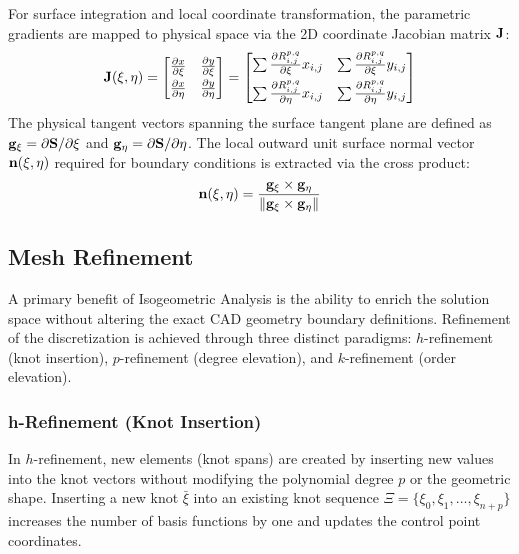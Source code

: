 For surface integration and local coordinate transformation, the parametric gradients are mapped to physical space via the 2D coordinate Jacobian matrix $\mathbf{J}$:
\begin{equation}
    \label{eq:jacobian}
    \mathbf{J}(\xi, \eta) = \begin{bmatrix} \frac{\partial x}{\partial \xi} & \frac{\partial y}{\partial \xi} \\[0.3em] \frac{\partial x}{\partial \eta} & \frac{\partial y}{\partial \eta} \end{bmatrix} = \begin{bmatrix} \sum \frac{\partial R_{i,j}^{p,q}}{\partial \xi} x_{i,j} & \sum \frac{\partial R_{i,j}^{p,q}}{\partial \xi} y_{i,j} \\[0.5em] \sum \frac{\partial R_{i,j}^{p,q}}{\partial \eta} x_{i,j} & \sum \frac{\partial R_{i,j}^{p,q}}{\partial \eta} y_{i,j} \end{bmatrix}
\end{equation}
The physical tangent vectors spanning the surface tangent plane are defined as $\mathbf{g}_{\xi} = \partial \mathbf{S}/\partial \xi$ and $\mathbf{g}_{\eta} = \partial \mathbf{S}/\partial \eta$. The local outward unit surface normal vector $\mathbf{n}(\xi, \eta)$ required for boundary conditions is extracted via the cross product:
\begin{equation}
    \mathbf{n}(\xi, \eta) = \frac{\mathbf{g}_{\xi} \times \mathbf{g}_{\eta}}{\|\mathbf{g}_{\xi} \times \mathbf{g}_{\eta}\|}
\end{equation}

\subsection{Mesh Refinement}
A primary benefit of Isogeometric Analysis is the ability to enrich the solution space without altering the exact CAD geometry boundary definitions. Refinement of the discretization is achieved through three distinct paradigms: $h$-refinement (knot insertion), $p$-refinement (degree elevation), and $k$-refinement (order elevation).

\subsubsection{h-Refinement (Knot Insertion)}
In $h$-refinement, new elements (knot spans) are created by inserting new values into the knot vectors without modifying the polynomial degree $p$ or the geometric shape. Inserting a new knot $\bar{\xi}$ into an existing knot sequence $\Xi = \{\xi_0, \xi_1, \dots, \xi_{n+p}\}$ increases the number of basis functions by one and updates the control point coordinates.


